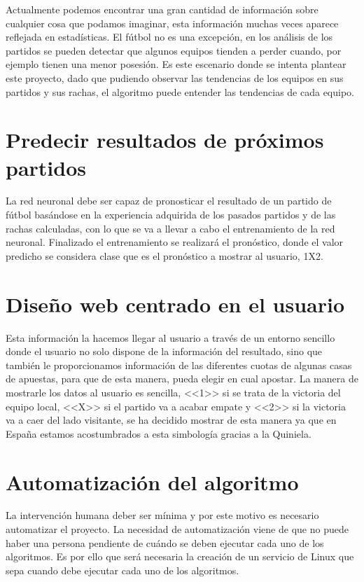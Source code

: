 
Actualmente podemos encontrar una gran cantidad de información sobre cualquier cosa que podamos imaginar, esta información muchas veces aparece reflejada en estadísticas. El fútbol no es una excepción, en los análisis de los partidos se pueden detectar que algunos equipos tienden a perder cuando, por ejemplo tienen una menor posesión. Es este escenario donde se intenta plantear este proyecto, dado que pudiendo observar las tendencias de los equipos en sus partidos y sus rachas, el algoritmo puede entender las tendencias de cada equipo.

\section{Predecir resultados de próximos partidos}

La red neuronal debe ser capaz de pronosticar el resultado de un partido de fútbol basándose en la experiencia adquirida de los pasados partidos y de las rachas calculadas, con lo que se va a llevar a cabo el entrenamiento de la red neuronal. Finalizado el entrenamiento se realizará el pronóstico, donde el valor predicho se considera clase que es el pronóstico a mostrar al usuario, 1X2.

\section{Diseño web centrado en el usuario}

Esta información la hacemos llegar al usuario a través de un entorno sencillo donde el usuario no solo dispone de la información del resultado, sino que también le proporcionamos información de las diferentes cuotas de algunas casas de apuestas, para que de esta manera, pueda elegir en cual apostar. La manera de mostrarle los datos al usuario es sencilla, <<1>> si se trata de la victoria del equipo local, <<X>> si el partido va a acabar empate y <<2>> si la victoria va a caer del lado visitante, se ha decidido mostrar de esta manera ya que en España estamos acostumbrados a esta simbología gracias a la Quiniela.

\section{Automatización del algoritmo}
La intervención humana deber ser mínima y por este motivo es necesario automatizar el proyecto. La necesidad de automatización viene de que no puede haber una persona pendiente de cuándo se deben ejecutar cada uno de los algoritmos.
Es por ello que será necesaria la creación de un servicio de Linux que sepa cuando debe ejecutar cada uno de los algoritmos.
